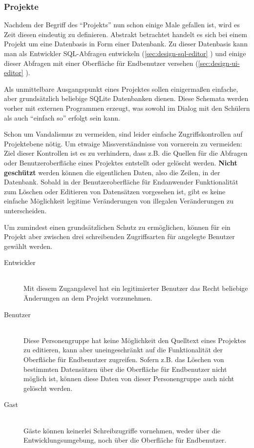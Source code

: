 \subsubsection{Projekte}

Nachdem der Begriff des ``Projekts'' nun schon einige Male gefallen ist, wird es Zeit diesen eindeutig zu definieren. Abstrakt betrachtet handelt es sich bei einem Projekt um eine Datenbasis in Form einer Datenbank. Zu dieser Datenbasis kann man als Entwickler SQL-Abfragen entwickeln (\ref{sec:design-sql-editor} ) und einige dieser Abfragen mit einer Oberfläche für Endbenutzer versehen (\ref{sec:design-ui-editor} ).

Als unmittelbare Ausgangspunkt eines Projektes sollen einigermaßen einfache, aber grundsätzlich beliebige SQLite Datenbanken dienen. Diese Schemata werden vorher mit externen Programmen erzeugt, was sowohl im Dialog mit den Schülern als auch ``einfach so'' erfolgt sein kann.

Schon um Vandalismus zu vermeiden, sind leider einfache Zugriffskontrollen auf Projektebene nötig. Um etwaige Missverständnisse von vornerein zu vermeiden: Ziel dieser Kontrollen ist es zu verhindern, dass z.B. die Quellen für die Abfragen oder Benutzeroberfläche eines Projektes entstellt oder gelöscht werden. \textbf{Nicht geschützt} werden können die eigentlichen Daten, also die Zeilen, in der Datenbank. Sobald in der Benutzeroberfläche für Endanwender Funktionalität zum Löschen oder Editieren von Datensätzen vorgesehen ist, gibt es keine einfache Möglichkeit legitime Veränderungen von illegalen Veränderungen zu unterscheiden.

Um zumindest einen grundsätzlichen Schutz zu ermöglichen, können für ein Projekt aber zwischen drei schreibenden Zugriffsarten für angelegte Benutzer gewählt werden.

\begin{description}
  \item[Entwickler] \hfill \\
    Mit diesem Zugangslevel hat ein legitimierter Benutzer das Recht beliebige Änderungen an dem Projekt vorzunehmen.
  \item[Benutzer] \hfill \\
    Diese Personengruppe hat keine Möglichkeit den Quelltext eines Projektes zu editieren, kann aber uneingeschränkt auf die Funktionalität der Oberfläche für Endbenutzer zugreifen. Sofern z.B. das Löschen von bestimmten Datensätzen über die Oberfläche für Endbenutzer nicht möglich ist, können diese Daten von dieser Personengruppe auch nicht gelöscht werden.
  \item[Gast] \hfill \\
    Gäste können keinerlei Schreibzugriffe vornehmen, weder über die Entwicklungsumgebung, noch über die Oberfläche für Endbenutzer.
\end{description}

